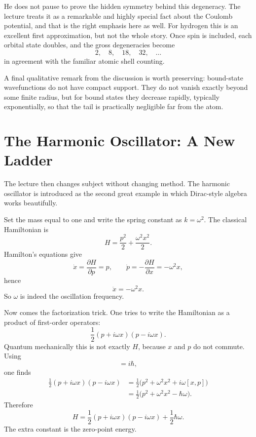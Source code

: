 He does not pause to prove the hidden symmetry behind this degeneracy. The lecture treats it as a remarkable and highly special fact about the Coulomb potential, and that is the right emphasis here as well. For hydrogen this is an excellent first approximation, but not the whole story. Once spin is included, each orbital state doubles, and the gross degeneracies become
\begin{equation}
2,\quad 8,\quad 18,\quad 32,\quad \dots
\end{equation}
in agreement with the familiar atomic shell counting.

A final qualitative remark from the discussion is worth preserving: bound-state wavefunctions do not have compact support. They do not vanish exactly beyond some finite radius, but for bound states they decrease rapidly, typically exponentially, so that the tail is practically negligible far from the atom.

\section{The Harmonic Oscillator: A New Ladder}

The lecture then changes subject without changing method. The harmonic oscillator is introduced as the second great example in which Dirac-style algebra works beautifully.

Set the mass equal to one and write the spring constant as \(k=\omega^2\). The classical Hamiltonian is
\begin{equation}
H=\frac{p^2}{2}+\frac{\omega^2x^2}{2}.
\end{equation}
Hamilton's equations give
\begin{equation}
\dot x=\frac{\partial H}{\partial p}=p,\qquad
\dot p=-\frac{\partial H}{\partial x}=-\omega^2x,
\end{equation}
hence
\begin{equation}
\ddot x=-\omega^2x.
\end{equation}
So \(\omega\) is indeed the oscillation frequency.

Now comes the factorization trick. One tries to write the Hamiltonian as a product of first-order operators:
\begin{equation}
\frac12(p+i\omega x)(p-i\omega x).
\end{equation}
Quantum mechanically this is not exactly \(H\), because \(x\) and \(p\) do not commute. Using
\begin{equation}
[x,p]=i\hbar,
\end{equation}
one finds
\begin{align}
\frac12(p+i\omega x)(p-i\omega x)
&=\frac12\bigl(p^2+\omega^2x^2+i\omega[x,p]\bigr) \\
&=\frac12\bigl(p^2+\omega^2x^2-\hbar\omega\bigr).
\end{align}
Therefore
\begin{equation}
H=\frac12(p+i\omega x)(p-i\omega x)+\frac12\hbar\omega.
\end{equation}
The extra constant is the zero-point energy.

